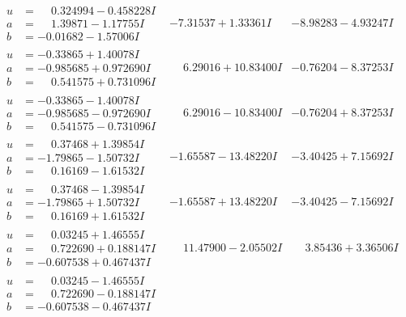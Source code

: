 \documentclass[1p]{elsarticle_modified}
\theoremstyle{definition}
\begin{document}
$$\begin{array}{c|c|c}
\begin{aligned}
u &= \phantom{-}0.324994 - 0.458228 I \\
a &= \phantom{-}1.39871 - 1.17755 I \\
b &= -0.01682 - 1.57006 I\end{aligned}
 & -7.31537 + 1.33361 I & -8.98283 - 4.93247 I \\ \hline\begin{aligned}
u &= -0.33865 + 1.40078 I \\
a &= -0.985685 + 0.972690 I \\
b &= \phantom{-}0.541575 + 0.731096 I\end{aligned}
 & \phantom{-}6.29016 + 10.83400 I & -0.76204 - 8.37253 I \\ \hline\begin{aligned}
u &= -0.33865 - 1.40078 I \\
a &= -0.985685 - 0.972690 I \\
b &= \phantom{-}0.541575 - 0.731096 I\end{aligned}
 & \phantom{-}6.29016 - 10.83400 I & -0.76204 + 8.37253 I \\ \hline\begin{aligned}
u &= \phantom{-}0.37468 + 1.39854 I \\
a &= -1.79865 - 1.50732 I \\
b &= \phantom{-}0.16169 - 1.61532 I\end{aligned}
 & -1.65587 - 13.48220 I & -3.40425 + 7.15692 I \\ \hline\begin{aligned}
u &= \phantom{-}0.37468 - 1.39854 I \\
a &= -1.79865 + 1.50732 I \\
b &= \phantom{-}0.16169 + 1.61532 I\end{aligned}
 & -1.65587 + 13.48220 I & -3.40425 - 7.15692 I \\ \hline\begin{aligned}
u &= \phantom{-}0.03245 + 1.46555 I \\
a &= \phantom{-}0.722690 + 0.188147 I \\
b &= -0.607538 + 0.467437 I\end{aligned}
 & \phantom{-}11.47900 - 2.05502 I & \phantom{-}3.85436 + 3.36506 I \\ \hline\begin{aligned}
u &= \phantom{-}0.03245 - 1.46555 I \\
a &= \phantom{-}0.722690 - 0.188147 I \\
b &= -0.607538 - 0.467437 I\end{aligned}

\end{array}$$
\end{document}
